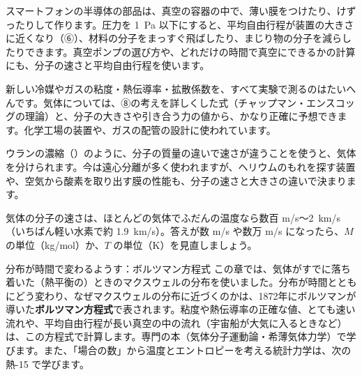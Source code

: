 \begin{phkougaku}[分子の運動を工学で使う]
スマートフォンの半導体の部品は、真空の容器の中で、薄い膜をつけたり、けずったりして作ります。圧力を \qty{1}{Pa} 以下にすると、平均自由行程が装置の大きさに近くなり（⑥）、材料の分子をまっすぐ飛ばしたり、まじり物の分子を減らしたりできます。真空ポンプの選び方や、どれだけの時間で真空にできるかの計算にも、分子の速さと平均自由行程を使います。

新しい冷媒やガスの粘度・熱伝導率・拡散係数を、すべて実験で測るのはたいへんです。気体については、⑧の考えを詳しくした式（チャップマン・エンスコッグの理論）と、分子の大きさや引き合う力の値から、かなり正確に予想できます。化学工場の装置や、ガスの配管の設計に使われています。

ウランの濃縮（）のように、分子の質量の違いで速さが違うことを使うと、気体を分けられます。今は遠心分離が多く使われますが、ヘリウムのもれを探す装置や、空気から酸素を取り出す膜の性能も、分子の速さと大きさの違いで決まります。

\begin{phketa}[分子の世界の数]
気体の分子の速さは、ほとんどの気体でふだんの温度なら数百 m/s〜\qty{2}{km/s}（いちばん軽い水素で約 \qty{1.9}{km/s}）。答えが数 m/s や数万 m/s になったら、$M$ の単位（kg/mol）か、$T$ の単位（K）を見直しましょう。
\end{phketa}
\end{phkougaku}

\begin{phsaki}{分布が時間で変わるようす：ボルツマン方程式}
この章では、気体がすでに落ち着いた（熱平衡の）ときのマクスウェルの分布を使いました。分布が時間とともにどう変わり、なぜマクスウェルの分布に近づくのかは、1872年にボルツマンが導いた\textbf{ボルツマン方程式}で表されます。粘度や熱伝導率の正確な値、とても速い流れや、平均自由行程が長い真空の中の流れ（宇宙船が大気に入るときなど）は、この方程式で計算します。専門の本（気体分子運動論・希薄気体力学）で学びます。また、「場合の数」から温度とエントロピーを考える統計力学は、次の熱-15 で学びます。
\end{phsaki}


